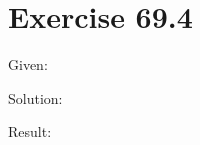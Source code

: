 \documentclass[a4paper, 10pt]{scrartcl}
\begin{document}
\section{Exercise 69.4}

Given:

Solution:

Result:
\end{document}
